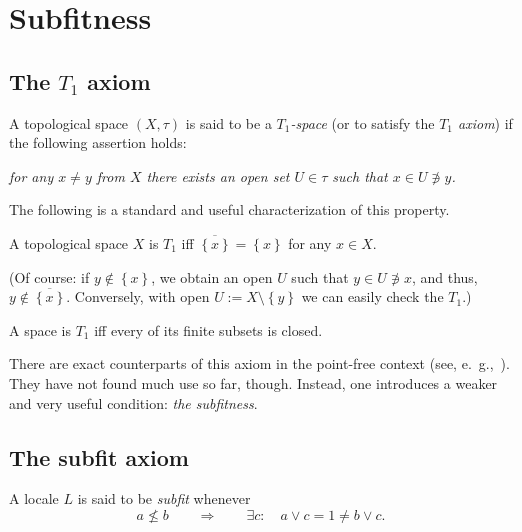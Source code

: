 \chapter{Subfitness}

\section{The $T_1$ axiom}

\begin{framed}
  \begin{df}[$T_1$]
    A topological space $(X, \tau)$ is said to be a \emph{$T_1$-space\/} (or to
    satisfy the \emph{$T_1$ axiom\/}) if the following assertion holds:
    \begin{center} \it
      for any $x \ne y$ from $X$ there exists an open set $U\in \tau$ such that
      $x\in U \not\owns y$.
    \end{center}
  \end{df}
\end{framed}

The following is a standard and useful characterization of this property.

\begin{fact-num} \label{T1Char}
  A topological space $X$ is $T_1$ iff $\overline{\left\{x\right\}} =
  \left\{x\right\}$ for any $x\in X$.
\end{fact-num}

(Of course:
if $y\not\in \left\{x\right\}$, we obtain an open $U$ such that $y\in
U\not\owns x$, and thus, $y\not\in \overline{\left\{x\right\}}$.
Conversely, with open $U:= X\setminus \left\{y\right\}$ we can easily check the
$T_1$.)

\begin{cor}
  A space is $T_1$ iff every of its finite subsets is closed.
\end{cor}

There are exact counterparts of this axiom in the point-free context (see,
e.~g.,~\cite{ds72}).
They have not found much use so far, though.
Instead, one introduces a weaker and very useful condition: {\sl the
subfitness\/}.

\section{The subfit axiom}

\begin{framed}
  \begin{df}[Sfit]
    A locale $L$ is said to be \emph{subfit\/} whenever
    \[
      a \not\le b \qquad \Rightarrow \qquad \exists c: \quad a \vee c = 1 \ne b
      \vee c.
    \]
  \end{df}
\end{framed}

